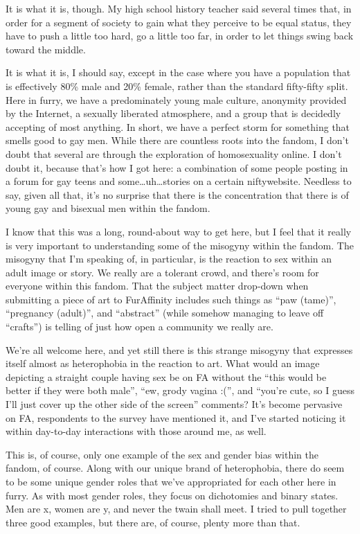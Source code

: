 It is what it is, though. My high school history teacher said several times that, in order for a segment of society to gain what they perceive to be equal status, they have to push a little too hard, go a little too far, in order to let things swing back toward the middle.

It is what it is, I should say, except in the case where you have a population that is effectively 80\% male and 20\% female, rather than the standard fifty-fifty split. Here in furry, we have a predominately young male culture, anonymity provided by the Internet, a sexually liberated atmosphere, and a group that is decidedly accepting of most anything. In short, we have a perfect storm for something that smells good to gay men. While there are countless roots into the fandom, I don't doubt that several are through the exploration of homosexuality online. I don't doubt it, because that's how I got here: a combination of some people posting in a forum for gay teens and some\ldots{}uh\ldots{}stories on a certain niftywebsite. Needless to say, given all that, it's no surprise that there is the concentration that there is of young gay and bisexual men within the fandom.

I know that this was a long, round-about way to get here, but I feel that it really is very important to understanding some of the misogyny within the fandom. The misogyny that I'm speaking of, in particular, is the reaction to sex within an adult image or story. We really are a tolerant crowd, and there's room for everyone within this fandom. That the subject matter drop-down when submitting a piece of art to FurAffinity includes such things as ``paw (tame)'', ``pregnancy (adult)'', and ``abstract'' (while somehow managing to leave off ``crafts'') is telling of just how open a community we really are.

We're all welcome here, and yet still there is this strange misogyny that expresses itself almost as heterophobia in the reaction to art. What would an image depicting a straight couple having sex be on FA without the ``this would be better if they were both male'', ``ew, grody vagina :('', and ``you're cute, so I guess I'll just cover up the other side of the screen'' comments? It's become pervasive on FA, respondents to the survey have mentioned it, and I've started noticing it within day-to-day interactions with those around me, as well.

This is, of course, only one example of the sex and gender bias within the fandom, of course. Along with our unique brand of heterophobia, there do seem to be some unique gender roles that we've appropriated for each other here in furry. As with most gender roles, they focus on dichotomies and binary states. Men are x, women are y, and never the twain shall meet. I tried to pull together three good examples, but there are, of course, plenty more than that.

